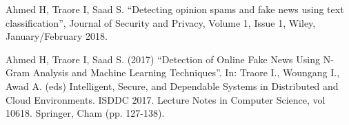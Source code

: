 \documentclass[conference]{IEEEtran}
\begin{document}
\begin{thebibliography}{00}
 Ahmed H, Traore I, Saad S. ``Detecting opinion spams and fake news using text classification'', Journal of Security and Privacy, Volume 1, Issue 1, Wiley, January/February 2018.

 Ahmed H, Traore I, Saad S. (2017) ``Detection of Online Fake News Using N-Gram Analysis and Machine Learning Techniques''. In: Traore I., Woungang I., Awad A. (eds) Intelligent, Secure, and Dependable Systems in Distributed and Cloud Environments. ISDDC 2017. Lecture Notes in Computer Science, vol 10618. Springer, Cham (pp. 127-138).

\end{thebibliography}
\newpage

% 
\end{document}

